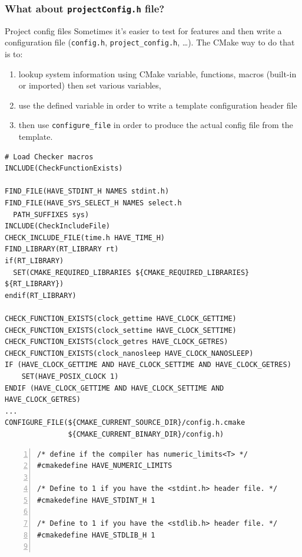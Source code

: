 \documentclass[compress,slidestop,table
              ]
               {beamer}
\newcommand{\fname}[1]{\texttt{#1}}
\begin{document}
\begin{frame}
\frametitle{What about \fname{projectConfig.h} file?}
\begin{block}{Project config files}
Sometimes it's easier to test for features and then write a
configuration file (\fname{config.h}, \fname{project\_config.h}, \ldots).
The CMake way to do that is to:
\begin{enumerate}
\item lookup system information using CMake variable, functions, macros (built-in or imported)
      then set various variables,
\item use the defined variable in order to write a template configuration
      header file
\item then use \lstinline!configure_file! in order to produce the actual
      config file from the template.
\end{enumerate}
\end{block}

\begin{lstlisting}[basicstyle=\tiny,caption=Excerpt from CERTI project's main \fname{CMakeLists.txt}]
# Load Checker macros
INCLUDE(CheckFunctionExists)

FIND_FILE(HAVE_STDINT_H NAMES stdint.h)
FIND_FILE(HAVE_SYS_SELECT_H NAMES select.h
  PATH_SUFFIXES sys)
INCLUDE(CheckIncludeFile)
CHECK_INCLUDE_FILE(time.h HAVE_TIME_H)
FIND_LIBRARY(RT_LIBRARY rt)
if(RT_LIBRARY)
  SET(CMAKE_REQUIRED_LIBRARIES ${CMAKE_REQUIRED_LIBRARIES} ${RT_LIBRARY})
endif(RT_LIBRARY)

CHECK_FUNCTION_EXISTS(clock_gettime HAVE_CLOCK_GETTIME)
CHECK_FUNCTION_EXISTS(clock_settime HAVE_CLOCK_SETTIME)
CHECK_FUNCTION_EXISTS(clock_getres HAVE_CLOCK_GETRES)
CHECK_FUNCTION_EXISTS(clock_nanosleep HAVE_CLOCK_NANOSLEEP)
IF (HAVE_CLOCK_GETTIME AND HAVE_CLOCK_SETTIME AND HAVE_CLOCK_GETRES)
    SET(HAVE_POSIX_CLOCK 1)
ENDIF (HAVE_CLOCK_GETTIME AND HAVE_CLOCK_SETTIME AND HAVE_CLOCK_GETRES)
...
CONFIGURE_FILE(${CMAKE_CURRENT_SOURCE_DIR}/config.h.cmake
               ${CMAKE_CURRENT_BINARY_DIR}/config.h)
\end{lstlisting}
\begin{Verbatim}[fontsize=\tiny,numbers=left,frame=topline,label=Excerpt from CERTI \fname{config.h.cmake}]
/* define if the compiler has numeric_limits<T> */
#cmakedefine HAVE_NUMERIC_LIMITS

/* Define to 1 if you have the <stdint.h> header file. */
#cmakedefine HAVE_STDINT_H 1

/* Define to 1 if you have the <stdlib.h> header file. */
#cmakedefine HAVE_STDLIB_H 1


\end{Verbatim}
\end{frame}
\end{document}
